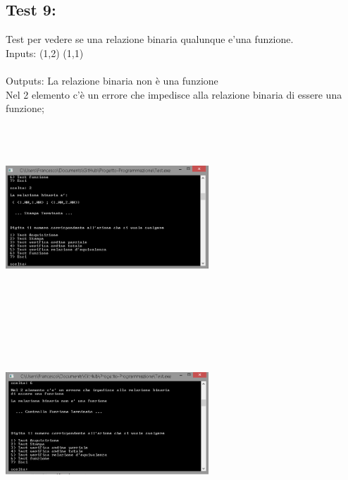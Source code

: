 \documentclass[11pt, a4paper, titlepage, block]{article}
\begin{document}
	\subsection{Test 9:}
	Test per vedere se una relazione binaria qualunque e'una funzione.\\
	Inputs: (1,2)  (1,1) \\
	\\
	Outputs: La relazione binaria non \`e una funzione\\
	Nel 2 elemento c'\`e un errore che impedisce alla relazione binaria di essere una funzione;\\
	\includegraphics[width=3in,height=3in,viewport=0 0 300 300]{../Screenshots/Test9Input.png}
	\\
	\includegraphics[width=3in,height=3in,viewport=0 0 300 300]{../Screenshots/Test9Output.PNG}
	\\
	\\
	\newpage
\end{document}
